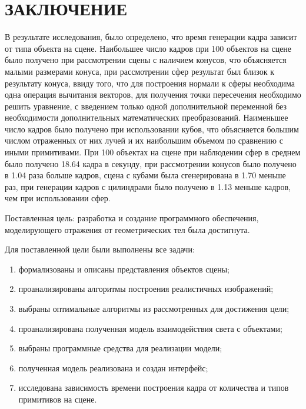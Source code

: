 \chapter*{\hfill{\centering  ЗАКЛЮЧЕНИЕ}\hfill}

В результате исследования, было определено, что время генерации кадра зависит от типа объекта на сцене. Наибольшее число кадров при 100 объектов на сцене было получено при рассмотрении сцены с наличием конусов, что объясняется малыми размерами конуса, при рассмотрении сфер результат был близок к результату конуса, ввиду того, что для построения нормали к сферы необходима одна операция вычитания векторов, для получения точки пересечения необходимо решить уравнение, с введением только одной дополнительной переменной без необходимости дополнительных математических преобразований. Наименьшее число кадров было получено
при использовании кубов, что объясняется большим числом отраженных от них лучей и их наибольшим объемом по сравнению с иными примитивами. При 100 объектах на сцене при наблюдении сфер в среднем было получено 18.64 кадра в секунду, при рассмотрении конусов было получено в 1.04 раза больше кадров, сцена с кубами была сгенерирована  в 1.70 меньше раз, при генерации кадров с цилиндрами было получено  в 1.13 меньше кадров, чем при использовании сфер.

Поставленная цель: разработка и создание программного обеспечения, моделирующего отражения от геометрических тел была достигнута.

Для поставленной цели были выполнены все задачи:
\begin{enumerate}
	\item формализованы и описаны представления объектов сцены;
	\item проанализированы алгоритмы построения реалистичных изображений;
	\item выбраны оптимальные алгоритмы из рассмотренных для достижения цели;
	\item проанализирована полученная модель взаимодействия света с объектами;
	\item выбраны программные средства для реализации модели;
	\item полученная модель реализована и создан интерфейс;
	\item исследована зависимость времени построения кадра от количества и типов примитивов на сцене.
\end{enumerate}